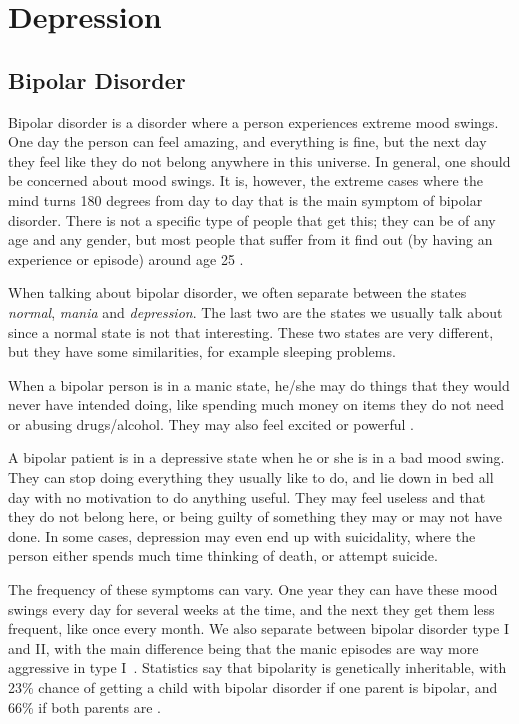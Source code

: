 \newpage
\section{Depression}
\subsection{Bipolar Disorder}

Bipolar disorder is a disorder where a person experiences extreme mood swings. One day the person can feel amazing, and everything is fine, 
but the next day they feel like they do not belong anywhere in this universe. In general, one should be concerned about mood swings. 
It is, however, the extreme cases where the mind turns 180 degrees from day to day that is the main symptom of bipolar disorder. 
There is not a specific type of people that get this; they can be of any age and any gender, but most people that suffer from it find out 
(by having an experience or episode) around age 25 \cite{bipolar_statistics}. 

When talking about bipolar disorder, we often separate between the states \emph{normal}, \emph{mania} and \emph{depression}. 
The last two are the states we usually talk about since a normal state is not that interesting. These two states are very different, 
but they have some similarities, for example sleeping problems. 

When a bipolar person is in a manic state, he/she may do things that they would never have intended doing, like spending much money on items they do 
not need or abusing drugs/alcohol. They may also feel excited or powerful \cite{bipolar_overview}. 

A bipolar patient is in a depressive state when he or she is in a bad mood swing. They can stop doing everything they usually like to do, 
and lie down in bed all day with no motivation to do anything useful. They may feel useless and that they do not belong here, 
or being guilty of something they may or may not have done. In some cases, depression may even end up with suicidality, 
where the person either spends much time thinking of death, or attempt suicide.

The frequency of these symptoms can vary. One year they can have these mood swings every day for several weeks at the time, and the next they get them less frequent, 
like once every month. We also separate between bipolar disorder type I and II, with the main difference being that the manic episodes are way 
more aggressive in type I \cite{bipolar_types}. Statistics say that bipolarity is genetically inheritable, with 23\% chance of getting a child with bipolar 
disorder if one parent is bipolar, and 66\% if both parents are \cite{bipolar_statistics}. 

